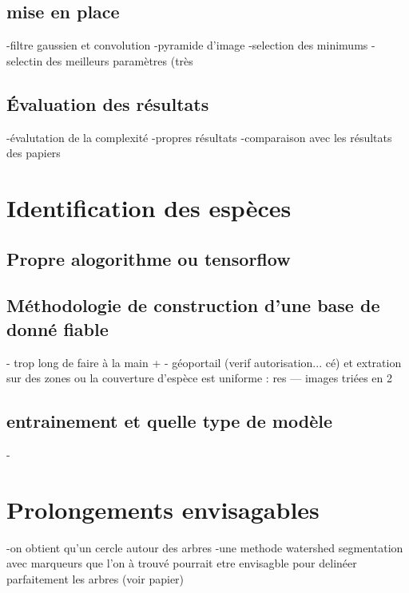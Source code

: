 \documentclass{article}
\begin{document}
	\subsection{mise en place}
		-filtre gaussien et convolution 
		-pyramide d'image
		-selection des minimums 
		-selectin des meilleurs paramètres (très  

	\subsection{\'{E}valuation des résultats}
		-évalutation de la complexité 
		-propres résultats
		-comparaison avec les résultats des papiers 

\section{Identification des espèces}
	
	\subsection{Propre alogorithme ou  tensorflow}
	
	\subsection{Méthodologie de construction d'une base de donné fiable}
		- trop long de faire à la main + 
		- géoportail (verif autorisation... cé) et extration sur des zones ou la couverture d'espèce est uniforme : res --- images triées en 2
	
	\subsection{entrainement et quelle type de modèle }
		-

\section{Prolongements envisagables}
	-on obtient qu'un cercle autour des arbres
	-une methode watershed segmentation avec marqueurs que l'on à trouvé pourrait etre envisagble pour delinéer parfaitement les arbres (voir papier) 

\nocite{NatesanResNet} %


\end{document}
